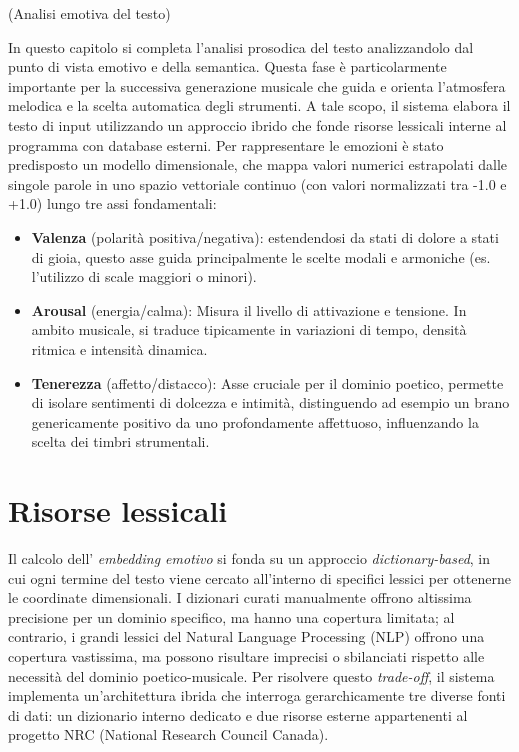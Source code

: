 (Analisi emotiva del testo)

In questo capitolo si completa l'analisi prosodica del testo analizzandolo dal punto di vista emotivo e della semantica. 
Questa fase è particolarmente importante per la successiva  generazione musicale che guida e orienta l'atmosfera melodica e la scelta automatica 
degli strumenti. A tale scopo, il sistema elabora il testo di input utilizzando un approccio ibrido che fonde risorse lessicali interne al programma 
con database esterni. Per rappresentare le emozioni è stato predisposto un modello dimensionale, che mappa valori numerici estrapolati dalle singole 
parole in uno spazio vettoriale continuo (con valori normalizzati tra -1.0 e +1.0) lungo tre assi fondamentali: 
\begin{itemize}
    \item \textbf{Valenza} (polarità positiva/negativa): estendendosi da stati di dolore a stati di gioia, questo asse guida principalmente le scelte modali 
    e armoniche (es. l'utilizzo di scale maggiori o minori).
    \item \textbf{Arousal} (energia/calma): Misura il livello di attivazione e tensione. In ambito musicale, si traduce tipicamente in variazioni di tempo, 
    densità ritmica e intensità dinamica.
    \item \textbf{Tenerezza} (affetto/distacco): Asse cruciale per il dominio poetico, permette di isolare sentimenti di dolcezza e intimità, distinguendo 
    ad esempio un brano genericamente positivo da uno profondamente affettuoso, influenzando la scelta dei timbri strumentali.
\end{itemize}



\section{Risorse lessicali}
Il calcolo dell' \textit{embedding emotivo} si fonda su un approccio \textit{dictionary-based}, in cui ogni termine del testo viene cercato all'interno di 
specifici lessici per ottenerne le coordinate dimensionali. I dizionari curati manualmente offrono altissima precisione per un dominio specifico, ma hanno 
una copertura limitata; al contrario, i grandi lessici del Natural Language Processing (NLP) offrono una copertura vastissima, ma possono risultare 
imprecisi o sbilanciati rispetto alle necessità del dominio poetico-musicale. Per risolvere questo \textit{trade-off}, il sistema implementa un'architettura 
ibrida che interroga gerarchicamente tre diverse fonti di dati: un dizionario interno dedicato e due risorse esterne appartenenti al progetto NRC 
(National Research Council Canada).


